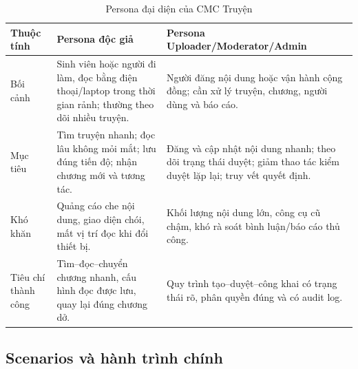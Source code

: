 \begin{table}[H]
\centering
\caption{Persona đại diện của CMC Truyện}
\label{tab:personas}
\begin{tabularx}{\textwidth}{|>{\RaggedRight\arraybackslash}p{2.4cm}|>{\RaggedRight\arraybackslash}X|>{\RaggedRight\arraybackslash}X|}
\hline
\textbf{Thuộc tính} & \textbf{Persona độc giả} & \textbf{Persona Uploader/Moderator/Admin} \\
\hline
Bối cảnh & Sinh viên hoặc người đi làm, đọc bằng điện thoại/laptop trong thời gian rảnh; thường theo dõi nhiều truyện. & Người đăng nội dung hoặc vận hành cộng đồng; cần xử lý truyện, chương, người dùng và báo cáo. \\
\hline
Mục tiêu & Tìm truyện nhanh; đọc lâu không mỏi mắt; lưu đúng tiến độ; nhận chương mới và tương tác. & Đăng và cập nhật nội dung nhanh; theo dõi trạng thái duyệt; giảm thao tác kiểm duyệt lặp lại; truy vết quyết định. \\
\hline
Khó khăn & Quảng cáo che nội dung, giao diện chói, mất vị trí đọc khi đổi thiết bị. & Khối lượng nội dung lớn, công cụ cũ chậm, khó rà soát bình luận/báo cáo thủ công. \\
\hline
Tiêu chí thành công & Tìm--đọc--chuyển chương nhanh, cấu hình đọc được lưu, quay lại đúng chương dở. & Quy trình tạo--duyệt--công khai có trạng thái rõ, phân quyền đúng và có audit log. \\
\hline
\end{tabularx}
\end{table}

\clearpage
\subsection{Scenarios và hành trình chính}

